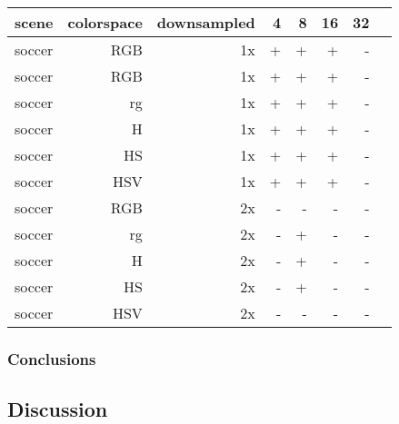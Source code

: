 \documentclass[a4paper,11pt]{article}
\begin{document}
	\begin{tabular}{l*{7}{r|}}

		scene	& 	colorspace	& downsampled & 4 & 8 & 16 & 32\\

		\hline

		soccer 	& 	RGB	 		& 1x		  			  & + & + & +  &  -\\

		soccer 	& 	RGB	 		& 1x		  			  & + & + & +  &  -\\

		soccer 	& 	rg	 		& 1x 		  			  & + & + & +  &  -\\

		soccer 	& 	H	 		& 1x		 			  & + & + & +  &  -\\

		soccer 	& 	HS	 		& 1x		  			  & + & + & +  &  -\\

		soccer 	& 	HSV	 		& 1x		  			  & + & + & +  &  -\\

		soccer 	& 	RGB	 		& 2x		  			  & - & - & -  &  -\\

		soccer 	& 	rg	 		& 2x 		  			  & - & + & -  &  -\\

		soccer 	& 	H	 		& 2x		  			  & - & + & -  &  -\\

		soccer 	& 	HS	 		& 2x		  			  & - & + & -  &  -\\

		soccer 	& 	HSV	 		& 2x		  			  & - & - & -  &  -\\

	\end{tabular}	



\subsubsection{Conclusions}






\subsection{Discussion} %
\end{document}
